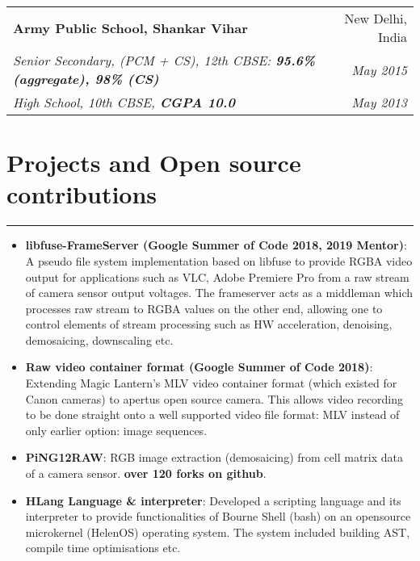 \documentclass[a4paper,6pt]{article}
\begin{document}
\vspace{5px}
\hspace{5px}
\begin{tabularx}{\textwidth}{X r}
	\textbf{Army Public School, Shankar Vihar} & New Delhi, India \\
	\textit{\small Senior Secondary, (PCM + CS), 12th CBSE:  \textcolor{mygray}{\textbf{95.6\% (aggregate), 98\% (CS)}}} & \textit{May 2015} \\
	\textit{\small High School, 10th CBSE, \textcolor{mygray}{\textbf{CGPA 10.0}}} & \textit{May 2013}
\end{tabularx}




\section*{Projects and Open source contributions}
\vspace{-8px}
\hrule
\vspace{4px}
\hspace{5px}
\begin{itemize}
    \item \textbf{libfuse-FrameServer (Google Summer of Code 2018, 2019 Mentor)}:  \small A pseudo file system implementation based on libfuse to provide RGBA video output for applications such as VLC, Adobe Premiere Pro from a raw stream of camera sensor output voltages. The frameserver acts as a middleman which processes raw stream to RGBA values on the other end, allowing one to control elements of stream processing such as HW acceleration, denoising, demosaicing, downscaling etc.\normalsize
\vspace{2px}
    \item \textbf{Raw video container format (Google Summer of Code 2018)}: \small Extending Magic Lantern's MLV video container format (which existed for Canon cameras) to apertus open source camera. This allows video recording to be done straight onto a well supported video file format: MLV instead of only earlier option: image sequences.
 \vspace{2px}
\normalsize
	\item \textbf{PiNG12RAW}: \small RGB image extraction (demosaicing) from cell matrix data of a camera sensor. \textcolor{mygray}{\textbf{over 120 forks on github}}. 
\normalsize
\vspace{2px}
    \item \textbf{HLang Language \& interpreter}: \small Developed a scripting language and its interpreter to provide functionalities of Bourne Shell (bash) on an opensource microkernel (HelenOS) operating system. The system included building AST, compile time optimisations etc. 

\normalsize
\end{itemize}
\end{document}
